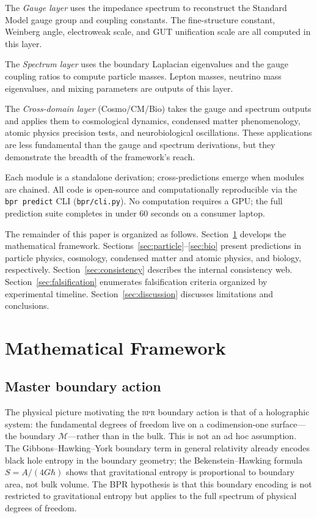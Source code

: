 \documentclass[aps,prd,twocolumn,superscriptaddress,longbibliography,nofootinbib]{revtex4-2}
\newcommand{\bpr}{\textsc{bpr}}
\begin{document}
The \textit{Gauge layer} uses the impedance spectrum to reconstruct
the Standard Model gauge group and coupling constants.  The
fine-structure constant, Weinberg angle, electroweak scale, and GUT
unification scale are all computed in this layer.

The \textit{Spectrum layer} uses the boundary Laplacian eigenvalues
and the gauge coupling ratios to compute particle masses.  Lepton
masses, neutrino mass eigenvalues, and mixing parameters are outputs
of this layer.

The \textit{Cross-domain layer} (Cosmo/CM/Bio) takes the gauge and
spectrum outputs and applies them to cosmological dynamics, condensed
matter phenomenology, atomic physics precision tests, and
neurobiological oscillations.  These applications are less
fundamental than the gauge and spectrum derivations, but they
demonstrate the breadth of the framework's reach.

Each module is a standalone derivation; cross-predictions emerge
when modules are chained.  All code is open-source and
computationally reproducible via the \texttt{bpr predict} CLI
(\texttt{bpr/cli.py}).  No computation requires a GPU; the full
prediction suite completes in under 60 seconds on a consumer
laptop.

The remainder of this paper is organized as follows.
Section~\ref{sec:framework} develops the mathematical framework.
Sections~\ref{sec:particle}--\ref{sec:bio} present predictions in
particle physics, cosmology, condensed matter and atomic physics,
and biology, respectively.  Section~\ref{sec:consistency} describes
the internal consistency web.  Section~\ref{sec:falsification}
enumerates falsification criteria organized by experimental
timeline.  Section~\ref{sec:discussion} discusses limitations and
conclusions.


\section{Mathematical Framework}
\label{sec:framework}

\subsection{Master boundary action}

The physical picture motivating the \bpr{} boundary action is that of
a holographic system: the fundamental degrees of freedom live on a
codimension-one surface---the boundary $\mathcal{M}$---rather than
in the bulk.  This is not an ad hoc assumption.  The
Gibbons--Hawking--York boundary term in general relativity already
encodes black hole entropy in the boundary geometry; the
Bekenstein--Hawking formula $S = A/(4G\hbar)$ shows that
gravitational entropy is proportional to boundary area, not bulk
volume.  The BPR hypothesis is that this boundary encoding is not
restricted to gravitational entropy but applies to the full spectrum
of physical degrees of freedom.
\end{document}
